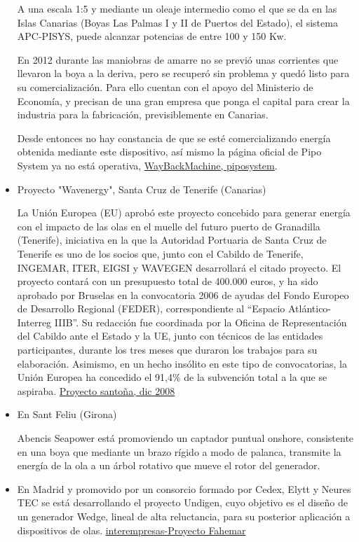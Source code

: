 \begin{itemize}
  A una escala 1:5 y mediante un oleaje intermedio como el que se da en
  las Islas Canarias (Boyas Las Palmas I y II de Puertos del Estado), el
  sistema APC-PISYS, puede alcanzar potencias de entre 100 y 150 Kw.

  En 2012 durante las maniobras de amarre no se previó unas corrientes
  que llevaron la boya a la deriva, pero se recuperó sin problema y
  quedó listo para su comercialización. Para ello cuentan con el apoyo
  del Ministerio de Economía, y precisan de una gran empresa que ponga
  el capital para crear la industria para la fabricación,
  previsiblemente en Canarias.

  Desde entonces no hay constancia de que se esté comercializando
  energía obtenida mediante este dispositivo, así mismo la página
  oficial de Pipo System ya no está operativa,
  \href{https://web.archive.org/web/20170427103046/http://www.piposystems.com/welcome.html}{WayBackMachine,
  piposystem}.
\item
  Proyecto "Wavenergy", Santa Cruz de Tenerife (Canarias)

  La Unión Europea (EU) aprobó este proyecto concebido para generar
  energía con el impacto de las olas en el muelle del futuro puerto de
  Granadilla (Tenerife), iniciativa en la que la Autoridad Portuaria de
  Santa Cruz de Tenerife es uno de los socios que, junto con el Cabildo
  de Tenerife, INGEMAR, ITER, EIGSI y WAVEGEN desarrollará el citado
  proyecto. El proyecto contará con un presupuesto total de 400.000
  euros, y ha sido aprobado por Bruselas en la convocatoria 2006 de
  ayudas del Fondo Europeo de Desarrollo Regional (FEDER),
  correspondiente al ``Espacio Atlántico-Interreg IIIB''. Su redacción
  fue coordinada por la Oficina de Representación del Cabildo ante el
  Estado y la UE, junto con técnicos de las entidades participantes,
  durante los tres meses que duraron los trabajos para su elaboración.
  Asimismo, en un hecho insólito en este tipo de convocatorias, la Unión
  Europea ha concedido el 91,4\% de la subvención total a la que se
  aspiraba.
  \href{http://www.mapama.gob.es/ministerio/pags/Biblioteca/Revistas/pdf_AM\%2FAM_2008_83_26_31\%5B1\%5D.pdf}{Proyecto
  santoña, dic 2008}
\item
  En Sant Feliu (Girona)

  Abencis Seapower está promoviendo un captador puntual onshore,
  consistente en una boya que mediante un brazo rígido a modo de
  palanca, transmite la energía de la ola a un árbol rotativo que mueve
  el rotor del generador.
\item
  En Madrid y promovido por un consorcio formado por Cedex, Elytt y
  Neures TEC se está desarrollando el proyecto Undigen, cuyo objetivo es
  el diseño de un generador Wedge, lineal de alta reluctancia, para su
  posterior aplicación a dispositivos de olas.
  \href{http://www.interempresas.net/Energia/Articulos/126331-Generar-energia-a-partir-de-energia-undimotriz.html}{interempresas-Proyecto
  Fahemar}
\end{itemize}
